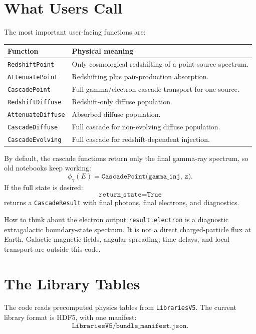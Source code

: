 \documentclass[11pt]{article}
\newcommand{\code}[1]{\texttt{#1}}
\begin{document}
\section{What Users Call}

The most important user-facing functions are:

\begin{center}
\begin{tabularx}{0.95\linewidth}{@{}lX@{}}
\toprule
\textbf{Function} & \textbf{Physical meaning} \\
\midrule
\code{RedshiftPoint} & Only cosmological redshifting of a point-source spectrum. \\
\code{AttenuatePoint} & Redshifting plus pair-production absorption. \\
\code{CascadePoint} & Full gamma/electron cascade transport for one source. \\
\code{RedshiftDiffuse} & Redshift-only diffuse population. \\
\code{AttenuateDiffuse} & Absorbed diffuse population. \\
\code{CascadeDiffuse} & Full cascade for non-evolving diffuse population. \\
\code{CascadeEvolving} & Full cascade for redshift-dependent injection. \\
\bottomrule
\end{tabularx}
\end{center}

By default, the cascade functions return only the final gamma-ray spectrum,
so old notebooks keep working:
\[
  \phi_\gamma(E) = \code{CascadePoint(gamma\_inj, z)} .
\]
If the full state is desired:
\[
  \code{return\_state=True}
\]
returns a \code{CascadeResult} with final photons, final electrons, and
diagnostics.

\begin{warnbox}{How to think about the electron output}
\code{result.electron} is a diagnostic extragalactic boundary-state spectrum.
It is not a direct charged-particle flux at Earth. Galactic magnetic fields,
angular spreading, time delays, and local transport are outside this code.
\end{warnbox}

\section{The Library Tables}

The code reads precomputed physics tables from \code{LibrariesV5}. The current
library format is HDF5, with one manifest:
\[
  \code{LibrariesV5/bundle\_manifest.json}.
\]
\end{document}
